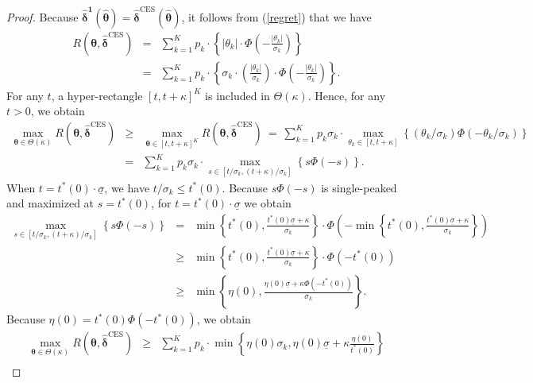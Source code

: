 \documentclass[12pt,a4paper]{article}
\begin{document}
\begin{proof}
Because $\hat{\bm{\delta}}^{\bm{1}}(\hat{\bm{\theta}}) = \hat{\bm{\delta}}^{\text{CES}}(\hat{\bm{\theta}})$, it follows from (\ref{regret}) that we have
\begin{eqnarray*}
R(\bm{\theta},\hat{\bm{\delta}}^{\text{CES}}) &=&  \sum_{k=1}^K p_k \cdot \left\{ |\theta_k| \cdot  \Phi \left( -   \frac{|\theta_k|}{\sigma_k} \right) \right\} \\
&=& \sum_{k=1}^K p_k \cdot \left\{ \sigma_k \cdot \left( \frac{|\theta_k|}{\sigma_k} \right) \cdot  \Phi \left( -   \frac{|\theta_k|}{\sigma_k} \right) \right\}.
\end{eqnarray*}
For any $t$, a hyper-rectangle $[t,t+\kappa]^K$ is included in $\Theta(\kappa)$. Hence, for any $t>0$, we obtain
\begin{eqnarray*}
\max_{\bm{\theta} \in \Theta(\kappa)} R(\bm{\theta},\hat{\bm{\delta}}^{\text{CES}}) & \geq & \max_{\bm{\theta} \in [t,t+\kappa]^K} R(\bm{\theta},\hat{\bm{\delta}}^{\text{CES}}) \ = \ \sum_{k=1}^K p_k \sigma_k \cdot \max_{\theta_k \in [t,t+\kappa]} \left\{ (\theta_k / \sigma_k) \Phi(-\theta_k / \sigma_k) \right\} \\
&=&  \sum_{k=1}^K p_k \sigma_k \cdot \max_{s \in [t/\sigma_k,(t+\kappa)/\sigma_k]} \left\{ s \Phi(-s) \right\}.
\end{eqnarray*}
When $t = t^{\ast}(0) \cdot \underline{\sigma}$, we have $t/\sigma_k \leq t^{\ast}(0)$. Because $s \Phi(-s)$ is single-peaked and maximized at $s = t^{\ast}(0)$, for $t = t^{\ast}(0) \cdot \underline{\sigma}$ we obtain
\begin{eqnarray*}
\max_{s \in [t/\sigma_k,(t+\kappa)/\sigma_k]} \left\{ s \Phi(-s) \right\} &=& \min \left\{ t^{\ast}(0), \frac{t^{\ast}(0)\underline{\sigma}+\kappa}{\sigma_k} \right\} \cdot \Phi \left( - \min \left\{ t^{\ast}(0), \frac{t^{\ast}(0)\underline{\sigma}+\kappa}{\sigma_k} \right\} \right) \\
& \geq &  \min \left\{ t^{\ast}(0), \frac{t^{\ast}(0)\underline{\sigma}+\kappa}{\sigma_k} \right\} \cdot \Phi(-t^{\ast}(0)) \\
& \geq & \min \left\{ \eta(0), \frac{\eta(0) \underline{\sigma} + \kappa \Phi(-t^{\ast}(0))}{\sigma_k} \right\}.
\end{eqnarray*}
Because $\eta(0) = t^{\ast}(0) \Phi(-t^{\ast}(0))$, we obtain
\begin{eqnarray}
\max_{\bm{\theta} \in \Theta(\kappa)} R(\bm{\theta},\hat{\bm{\delta}}^{\text{CES}}) & \geq & \sum_{k=1}^K p_k \cdot \min \left\{ \eta(0) \sigma_k,  \eta(0) \underline{\sigma} + \kappa \frac{\eta(0)}{t^{\ast}(0)} \right\} \nonumber \\

\end{eqnarray}
\end{proof}
\end{document}
